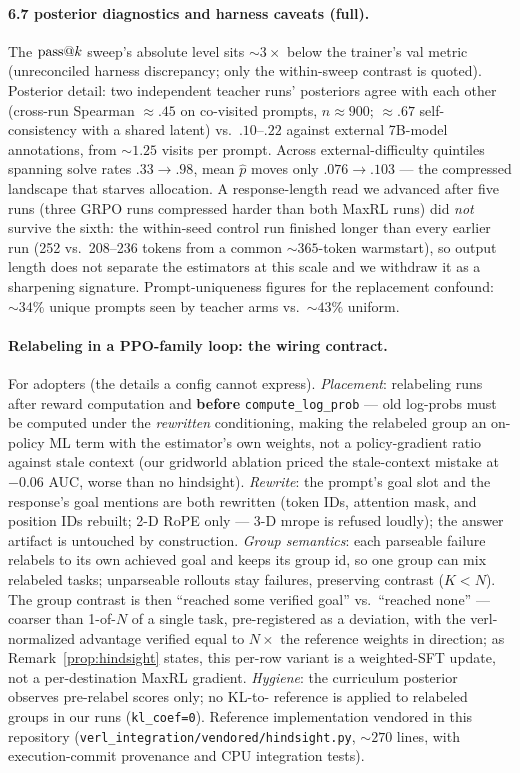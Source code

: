\paragraph{6.7 posterior diagnostics and harness caveats (full).}
The $\text{pass@}k$ sweep's absolute level sits ${\sim}3\times$ below the
trainer's val metric (unreconciled harness discrepancy; only the
within-sweep contrast is quoted). Posterior detail: two independent
teacher runs' posteriors agree with each other (cross-run Spearman
${\approx}.45$ on co-visited prompts, $n{\approx}900$; $\approx.67$
self-consistency with a shared latent) vs.\ $.10$--$.22$ against
external 7B-model annotations, from ${\sim}1.25$ visits per prompt.
Across external-difficulty quintiles spanning solve rates $.33 \to
.98$, mean $\hat p$ moves only $.076 \to .103$ --- the compressed
landscape that starves allocation. A response-length read we
advanced after five runs (three GRPO runs compressed harder than both
MaxRL runs) did \emph{not} survive the sixth: the within-seed control
run finished longer than every earlier run (252 vs.\ 208--236 tokens
from a common ${\sim}365$-token warmstart), so output length does not
separate the estimators at this scale and we withdraw it as a
sharpening signature. Prompt-uniqueness figures for the replacement confound:
${\sim}34\%$ unique prompts seen by teacher arms vs.\ ${\sim}43\%$
uniform.

\paragraph{Relabeling in a PPO-family loop: the wiring contract.}
For adopters (the details a config cannot express). \emph{Placement}:
relabeling runs after reward computation and \textbf{before}
\texttt{compute\_log\_prob} --- old log-probs must be computed under
the \emph{rewritten} conditioning, making the relabeled group an
on-policy ML term with the estimator's own weights, not a
policy-gradient ratio against stale context (our gridworld ablation
priced the stale-context mistake at $-0.06$ AUC, worse than no
hindsight). \emph{Rewrite}: the prompt's goal slot and the response's
goal mentions are both rewritten (token IDs, attention mask, and
position IDs rebuilt; 2-D RoPE only --- 3-D mrope is refused loudly);
the answer artifact is untouched by construction. \emph{Group
semantics}: each parseable failure relabels to its own achieved goal
and keeps its group id, so one group can mix relabeled tasks;
unparseable rollouts stay failures, preserving contrast ($K<N$). The
group contrast is then ``reached some verified goal'' vs.\ ``reached
none'' --- coarser than 1-of-$N$ of a single task, pre-registered as a
deviation, with the verl-normalized advantage verified equal to
$N\times$ the reference weights in direction; as
Remark~\ref{prop:hindsight} states, this per-row variant is a
weighted-SFT update, not a per-destination MaxRL gradient.
\emph{Hygiene}: the
curriculum posterior observes pre-relabel scores only; no KL-to-
reference is applied to relabeled groups in our runs
(\texttt{kl\_coef=0}). Reference implementation vendored in this
repository (\texttt{verl\_integration/vendored/hindsight.py},
${\sim}270$ lines, with execution-commit provenance and CPU
integration tests).

